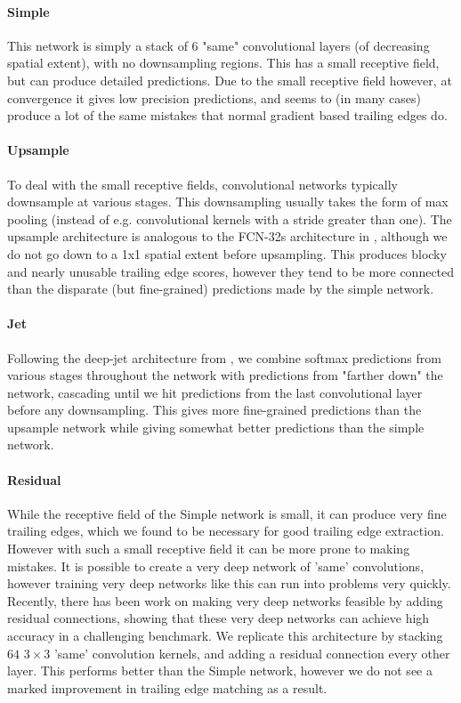 \paragraph{Simple}
This network is simply a stack of $6$ "same" convolutional layers (of decreasing spatial extent), with no downsampling regions.
This has a small receptive field, but can produce detailed predictions.
Due to the small receptive field however, at convergence it gives low precision predictions, and seems to (in many cases) produce a lot of the same mistakes that normal gradient based trailing edges do.

\paragraph{Upsample}
To deal with the small receptive fields, convolutional networks typically downsample at various stages. 
This downsampling usually takes the form of max pooling (instead of e.g. convolutional kernels with a stride greater than one).
The upsample architecture is analogous to the FCN-32s architecture in \cite{long2015fully}, although we do not go down to a 1x1 spatial extent before upsampling.
This produces blocky and nearly unusable trailing edge scores, however they tend to be more connected than the disparate (but fine-grained) predictions made by the simple network.


\paragraph{Jet}
Following the deep-jet architecture from \cite{long2015fully}, we combine softmax predictions from various stages throughout the network with predictions from "farther down" the network, cascading until we hit predictions from the last convolutional layer before any downsampling.
This gives more fine-grained predictions than the upsample network while giving somewhat better predictions than the simple network.


\paragraph{Residual}
While the receptive field of the Simple network is small, it can produce very fine trailing edges, which we found to be necessary for good trailing edge extraction.
However with such a small receptive field it can be more prone to making mistakes.
It is possible to create a very deep network of 'same' convolutions, however training very deep networks like this can run into problems very quickly.
Recently, there has been work on making very deep networks feasible by adding residual connections\cite{he2015deep}, showing that these very deep networks can achieve high accuracy in a challenging benchmark.
We replicate this architecture by stacking $64$ $3\times3$ 'same' convolution kernels, and adding a residual connection every other layer.
This performs better than the Simple network, however we do not see a marked improvement in trailing edge matching as a result.

